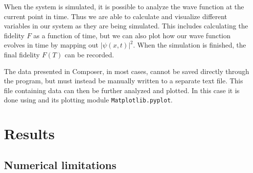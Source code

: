 \documentclass[a4paper, twocolumn]{revtex4-1}
\begin{document}
When the system is simulated, it is possible to analyze the wave function at the current point in time. Thus we are able to calculate and visualize different variables in our system as they are being simulated. This includes calculating the fidelity $F$ as a function of time, but we can also plot how our wave function evolves in time by mapping out $|\psi(x,t)|^2$. When the simulation is finished, the final fidelity $F(T)$ can be recorded.


The data presented in Composer, in most cases, cannot be saved directly through the program, but must instead be manually written to a separate text file. This file containing data can then be further analyzed and plotted. In this case it is done using  and its plotting module \texttt{Matplotlib.pyplot}.


\section{Results}\label{sec:results}
\subsection{Numerical limitations}\label{subsec:numericalLimitations} 
\end{document}
